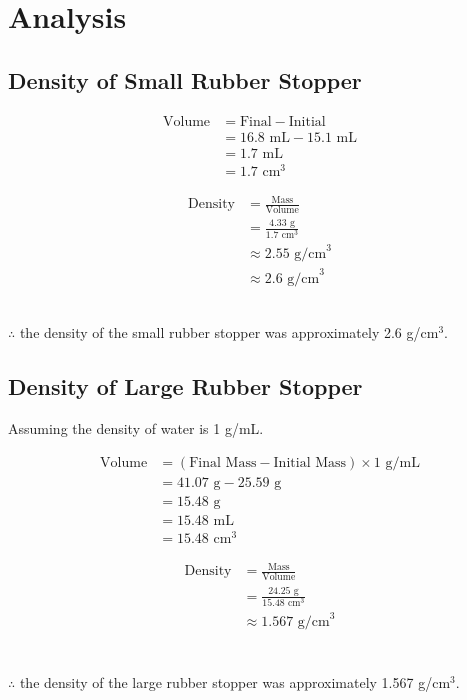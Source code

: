 \documentclass{article}
\begin{document}
\section{Analysis}
\subsection{Density of Small Rubber Stopper}

\noindent
\begin{minipage}[t]{0.45\textwidth}
    \begin{align*}
        \text{Volume} &= \text{Final} - \text{Initial} \\
        &= 16.8 \text{ mL} - 15.1 \text{ mL} \\
        &= 1.7 \text{ mL} \\
        &= 1.7 \text{ cm}^3
    \end{align*}
\end{minipage}
\hfill
\begin{minipage}[t]{0.45\textwidth}
    \begin{align*}
        \text{Density} &= \frac{\text{Mass}}{\text{Volume}} \\
        &= \frac{4.33 \text{ g}}{1.7 \text{ cm}^3} \\
        &\approx 2.55 \text{ g/cm}^3\\
        &\approx 2.6 \text{ g/cm}^3
    \end{align*}
\end{minipage}\\
$\therefore$ the density of the small rubber stopper was approximately 2.6 g/cm$^3$.

\subsection{Density of Large Rubber Stopper}

Assuming the density of water is 1 g/mL.\\
\noindent
\begin{minipage}[t]{0.45\textwidth}
    \begin{align*}
        \text{Volume} &= (\text{Final Mass} - \text{Initial Mass}) \times 1 \text{ g/mL}\\
        &= 41.07 \text{ g} - 25.59 \text{ g} \\
        &= 15.48 \text{ g} \\
        &= 15.48 \text{ mL} \\
        &= 15.48 \text{ cm}^3
    \end{align*}
\end{minipage}
\hfill
\begin{minipage}[t]{0.45\textwidth}
    \begin{align*}
        \text{Density} &= \frac{\text{Mass}}{\text{Volume}} \\
        &= \frac{24.25 \text{ g}}{15.48 \text{ cm}^3} \\
        &\approx 1.567 \text{ g/cm}^3\\
    \end{align*}
\end{minipage}
\vspace{0.125 in}\\
$\therefore$ the density of the large rubber stopper was approximately 1.567 g/cm$^3$.
\end{document}
